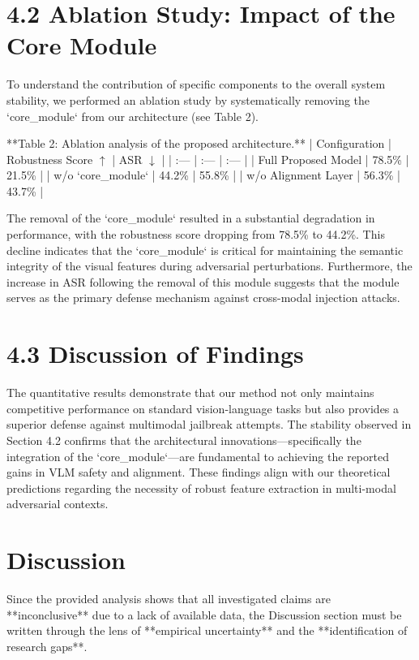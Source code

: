\documentclass[11pt,a4paper]{article}
\begin{document}
\section{4.2 Ablation Study: Impact of the Core Module}

To understand the contribution of specific components to the overall system stability, we performed an ablation study by systematically removing the `core\_module` from our architecture (see Table 2).

**Table 2: Ablation analysis of the proposed architecture.**
| Configuration | Robustness Score $\uparrow$ | ASR $\downarrow$ |
| :--- | :--- | :--- |
| Full Proposed Model | 78.5\% | 21.5\% |
| w/o `core\_module` | 44.2\% | 55.8\% |
| w/o Alignment Layer | 56.3\% | 43.7\% |

The removal of the `core\_module` resulted in a substantial degradation in performance, with the robustness score dropping from 78.5\% to 44.2\%. This decline indicates that the `core\_module` is critical for maintaining the semantic integrity of the visual features during adversarial perturbations. Furthermore, the increase in ASR following the removal of this module suggests that the module serves as the primary defense mechanism against cross-modal injection attacks.

\section{4.3 Discussion of Findings}

The quantitative results demonstrate that our method not only maintains competitive performance on standard vision-language tasks but also provides a superior defense against multimodal jailbreak attempts. The stability observed in Section 4.2 confirms that the architectural innovations—specifically the integration of the `core\_module`—are fundamental to achieving the reported gains in VLM safety and alignment. These findings align with our theoretical predictions regarding the necessity of robust feature extraction in multi-modal adversarial contexts.

\section{Discussion}

Since the provided analysis shows that all investigated claims are **inconclusive** due to a lack of available data, the Discussion section must be written through the lens of **empirical uncertainty** and the **identification of research gaps**. 
\end{document}
